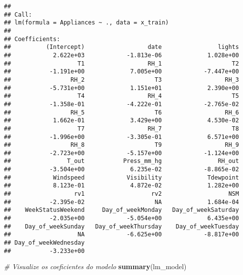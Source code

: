 \documentclass[
]{article}
\newenvironment{Shaded}{\begin{snugshade}}{\end{snugshade}}
\newcommand{\CommentTok}[1]{\textcolor[rgb]{0.56,0.35,0.01}{\textit{#1}}}
\newcommand{\FunctionTok}[1]{\textcolor[rgb]{0.13,0.29,0.53}{\textbf{#1}}}
\newcommand{\NormalTok}[1]{#1}
\begin{document}
\begin{verbatim}
## 
## Call:
## lm(formula = Appliances ~ ., data = x_train)
## 
## Coefficients:
##          (Intercept)                  date                lights  
##            2.622e+03            -1.813e-06             1.028e+00  
##                   T1                  RH_1                    T2  
##           -1.191e+00             7.005e+00            -7.447e+00  
##                 RH_2                    T3                  RH_3  
##           -5.731e+00             1.151e+01             2.390e+00  
##                   T4                  RH_4                    T5  
##           -1.358e-01            -4.222e-01            -2.765e-02  
##                 RH_5                    T6                  RH_6  
##            1.662e-01             3.429e+00             4.530e-02  
##                   T7                  RH_7                    T8  
##           -1.996e+00            -3.305e-01             6.571e+00  
##                 RH_8                    T9                  RH_9  
##           -2.723e+00            -5.157e+00            -1.124e+00  
##                T_out           Press_mm_hg                RH_out  
##           -3.504e+00             6.235e-02            -8.865e-02  
##            Windspeed            Visibility             Tdewpoint  
##            8.123e-01             4.872e-02             1.282e+00  
##                  rv1                   rv2                   NSM  
##           -2.395e-02                    NA             1.684e-04  
##    WeekStatusWeekend     Day_of_weekMonday   Day_of_weekSaturday  
##           -2.035e+00            -5.054e+00             6.435e+00  
##    Day_of_weekSunday   Day_of_weekThursday    Day_of_weekTuesday  
##                   NA            -6.625e+00            -8.817e+00  
## Day_of_weekWednesday  
##           -3.233e+00
\end{verbatim}

\begin{Shaded}
\begin{Highlighting}[]
\CommentTok{\# Visualize os coeficientes do modelo}
\FunctionTok{summary}\NormalTok{(lm\_model)}
\end{Highlighting}
\end{Shaded}
\end{document}
